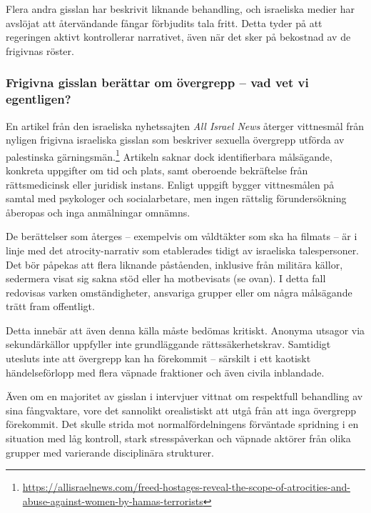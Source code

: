 Flera andra gisslan har beskrivit liknande behandling, och israeliska medier har avslöjat att återvändande fångar förbjudits tala fritt. Detta tyder på att regeringen aktivt kontrollerar narrativet, även när det sker på bekostnad av de frigivnas röster.

\subsubsection*{Frigivna gisslan berättar om övergrepp – vad vet vi egentligen?}


En artikel från den israeliska nyhetssajten \textit{All Israel News} återger vittnesmål från nyligen frigivna israeliska gisslan som beskriver sexuella övergrepp utförda av palestinska gärningsmän.\footnote{\url{https://allisraelnews.com/freed-hostages-reveal-the-scope-of-atrocities-and-abuse-against-women-by-hamas-terrorists}} Artikeln saknar dock identifierbara målsägande, konkreta uppgifter om tid och plats, samt oberoende bekräftelse från rättsmedicinsk eller juridisk instans. Enligt uppgift bygger vittnesmålen på samtal med psykologer och socialarbetare, men ingen rättslig förundersökning åberopas och inga anmälningar omnämns.

De berättelser som återges – exempelvis om våldtäkter som ska ha filmats – är i linje med det atrocity-narrativ som etablerades tidigt av israeliska talespersoner. Det bör påpekas att flera liknande påståenden, inklusive från militära källor, sedermera visat sig sakna stöd eller ha motbevisats (se ovan). I detta fall redovisas varken omständigheter, ansvariga grupper eller om några målsägande trätt fram offentligt.

Detta innebär att även denna källa måste bedömas kritiskt. Anonyma utsagor via sekundärkällor uppfyller inte grundläggande rättssäkerhetskrav. Samtidigt utesluts inte att övergrepp kan ha förekommit – särskilt i ett kaotiskt händelseförlopp med flera väpnade fraktioner och även civila inblandade. 

Även om en majoritet av gisslan i intervjuer vittnat om respektfull behandling av sina fångvaktare, vore det sannolikt orealistiskt att utgå från att inga övergrepp förekommit. Det skulle strida mot normalfördelningens förväntade spridning i en situation med låg kontroll, stark stresspåverkan och väpnade aktörer från olika grupper med varierande disciplinära strukturer.




